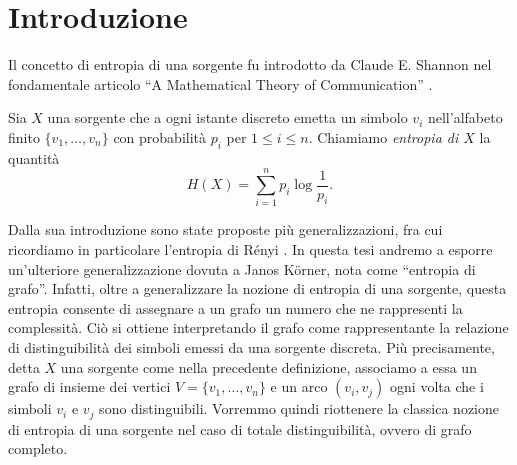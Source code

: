 \chapter{Introduzione} 
Il concetto di entropia di una sorgente fu introdotto da Claude E. Shannon nel fondamentale articolo ``A Mathematical Theory of Communication'' \cite{Shannon1948}.
\begin{definition}
  Sia \(X\) una sorgente che a ogni istante discreto emetta un simbolo \(v_i\) nell'alfabeto finito \(\{v_1,\dots,v_n\}\) con probabilit\`a \(p_i\) per \(1\le i\le n\). Chiamiamo \emph{entropia di \(X\)} la quantit\`a
  \[H(X)=\sum_{i=1}^n{p_i\log{\frac{1}{p_i}}}\text{.}\]
\end{definition}

Dalla sua introduzione sono state proposte più generalizzazioni, fra cui ricordiamo in particolare l'entropia di Rényi \cite{renyi1961}. In questa tesi andremo a esporre un'ulteriore generalizzazione dovuta a Janos K\"orner, nota come ``entropia di grafo''. Infatti, oltre a generalizzare la nozione di entropia di una sorgente, questa entropia consente di assegnare a un grafo un numero che ne rappresenti la complessit\`a. Ci\`o si ottiene interpretando il grafo come rappresentante la relazione di distinguibilit\`a dei simboli emessi da una sorgente discreta. Pi\`u precisamente, detta \(X\) una sorgente come nella precedente definizione, associamo a essa un grafo di insieme dei vertici \(V=\{v_1,\dots,v_n\}\) e un arco \((v_i,v_j)\) ogni volta che i simboli \(v_i\) e \(v_j\) sono distinguibili. Vorremmo quindi riottenere la classica nozione di entropia di una sorgente nel caso di totale distinguibilità, ovvero di grafo completo.

